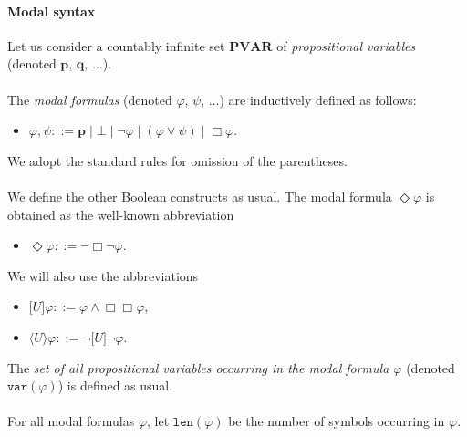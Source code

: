 \documentclass[draft]{article}
\def\size{\mathtt{len}}
\def\vvar{\mathtt{var}}
\def\PVAR{\mathbf{PVAR}}
\begin{document}
\paragraph{Modal syntax}
%
%
Let us consider a countably infinite set $\PVAR$ of {\it propositional variables}\/ (denoted $\mathbf{p}$, $\mathbf{q}$, $\ldots$).
%
%
\\
\\
%
%
The {\it modal formulas}\/ (denoted $\varphi$, $\psi$, $\ldots$) are inductively defined as follows:
%
%
\begin{itemize}
%
%
\item $\varphi,\psi::=\mathbf{p}\mid\bot\mid\neg\varphi\mid(\varphi\vee\psi)\mid\Box\varphi$.
%
%
\end{itemize}
%
%
We adopt the standard rules for omission of the parentheses.
%
%
\\
\\
%
%
We define the other Boolean constructs as usual.
The modal formula $\Diamond\varphi$ is obtained as the well-known abbreviation
%
%
\begin{itemize}
%
%
\item $\Diamond\varphi::=\neg\Box\neg\varphi$.
%
%
\end{itemize}
%
%
We will also use the abbreviations
%
%
\begin{itemize}
%
%
\item $\lbrack U\rbrack\varphi::=\varphi\wedge\Box\Box\varphi$,
%
%
\item $\langle U\rangle\varphi::=\neg\lbrack U\rbrack\neg\varphi$.
%
%
\end{itemize}
%
%
The {\it set of all propositional variables occurring in the modal formula $\varphi$}\/ (denoted $\vvar(\varphi)$) is defined as usual.
%
%
\\
\\
%
%
For all modal formulas $\varphi$, let $\size(\varphi)$ be the number of symbols occurring in $\varphi$.
%
%
%
%
\end{document}
